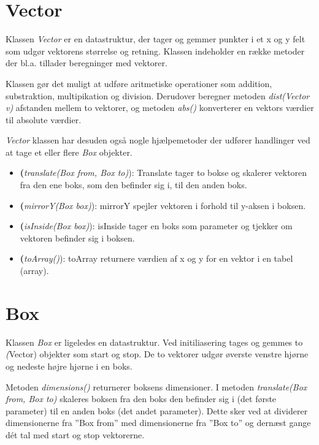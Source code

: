 \section{Vector}

Klassen \emph{Vector} er en datastruktur, der tager og gemmer punkter i et x og y felt som udgør vektorens størrelse og retning. Klassen indeholder en række metoder der bl.a. tillader beregninger med vektorer.

Klassen gør det muligt at udføre aritmetiske operationer som addition, substraktion, multipikation og division. Derudover beregner metoden \emph{dist(Vector v)} afstanden mellem to vektorer, og metoden \emph{abs()} konverterer en vektors værdier til absolute værdier.

\emph{Vector} klassen har desuden også nogle hjælpemetoder der udfører handlinger ved at tage et eller flere \emph{Box} objekter.

\begin{itemize}
	\item \textbf(\emph{translate(Box from, Box to)}): Translate tager to bokse og skalerer vektoren fra den ene boks, som den befinder sig i, til den anden boks.
	\item \textbf(\emph{mirrorY(Box box)}): mirrorY spejler vektoren i forhold til y-aksen i boksen.
	\item \textbf(\emph{isInside(Box box)}): isInside tager en boks som parameter og tjekker om vektoren befinder sig i boksen.
	\item \textbf(\emph{toArray()}): toArray returnere værdien af x og y for en vektor i en tabel (array).
\end{itemize}

\section{Box}

Klassen \emph{Box} er ligeledes en datastruktur. Ved initiliasering tages og gemmes to \emph(Vector) objekter som start og stop. De to vektorer udgør øverste venstre hjørne og nedeste højre hjørne i en boks.

Metoden \emph{dimensions()} returnerer boksens dimensioner. I metoden \emph{translate(Box from, Box to)} skaleres boksen fra den boks den befinder sig i (det første parameter) til en anden boks (det andet parameter). Dette sker ved at dividerer dimensionerne fra ''Box from'' med dimensionerne fra ''Box to'' og dernæst gange dét tal med start og stop vektorerne.

